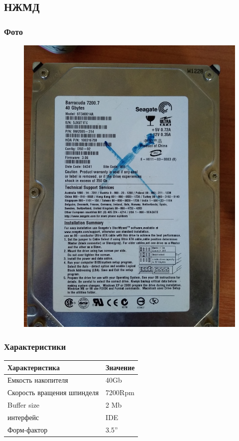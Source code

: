 \documentclass[a4paper]{article}
\begin{document}
\subsection{НЖМД}
\subsubsection{Фото}
\begin{figure}[H]
\centering
\includegraphics[scale=0.1]{harddrive.jpg} 
\end{figure}
\subsubsection{Характеристики}
\begin{table}[H]
    \centering
    \begin{tabular}{|l|l|}
    \hline
    Характеристика & Значение \\
    \hline
    Емкость накопителя & 40Gb \\
    Скорость вращения шпинделя & 7200Rpm \\
    Buffer size & 2 Mb \\
    интерфейс & IDE \\
    Форм-фактор & 3.5'' \\
    \hline
\end{tabular}
\end{table}
\end{document}
